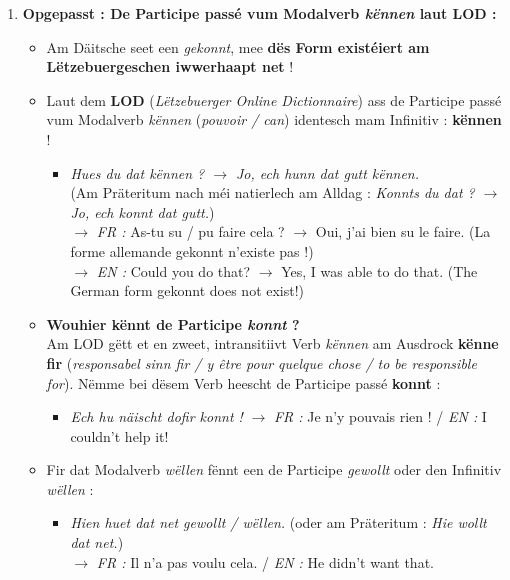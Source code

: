\begin{enumerate}
    \vspace{0.3em}

    \item \textbf{Opgepasst : De Participe passé vum Modalverb \textit{kënnen} laut LOD :}
    \begin{itemize}
        \item Am Däitsche seet een \textit{\flqq gekonnt\frqq}, mee \textbf{dës Form existéiert am Lëtzebuergeschen iwwerhaapt net} !
        \item Laut dem \textbf{LOD} (\textit{Lëtzebuerger Online Dictionnaire}) ass de Participe passé vum Modalverb \textit{kënnen} (\textit{pouvoir / can}) identesch mam Infinitiv : \textbf{kënnen} !
        \begin{itemize}
            \item \textit{Hues du dat kënnen ? $\rightarrow$ Jo, ech hunn dat gutt kënnen.} \\
            (Am Präteritum nach méi natierlech am Alldag : \textit{Konnts du dat ? $\rightarrow$ Jo, ech konnt dat gutt.}) \\
            $\rightarrow$ \textit{FR :} As-tu su / pu faire cela ? $\rightarrow$ Oui, j'ai bien su le faire. (La forme allemande \flqq gekonnt\frqq{} n'existe pas !) \\
            $\rightarrow$ \textit{EN :} Could you do that? $\rightarrow$ Yes, I was able to do that. (The German form \flqq gekonnt\frqq{} does not exist!)
        \end{itemize}
        \item \textbf{Wouhier kënnt de Participe \textit{\flqq konnt\frqq} ?} \\
        Am LOD gëtt et en zweet, intransitiivt Verb \textit{kënnen} am Ausdrock \textbf{kënne fir} (\textit{responsabel sinn fir / y être pour quelque chose / to be responsible for}). Nëmme bei dësem Verb heescht de Participe passé \textbf{konnt} :
        \begin{itemize}
            \item \textit{Ech hu näischt dofir konnt !} $\rightarrow$ \textit{FR :} Je n'y pouvais rien ! / \textit{EN :} I couldn't help it!
        \end{itemize}
        \item Fir dat Modalverb \textit{wëllen} fënnt een de Participe \textit{gewollt} oder den Infinitiv \textit{wëllen} :
        \begin{itemize}
            \item \textit{Hien huet dat net gewollt / wëllen.} (oder am Präteritum : \textit{Hie wollt dat net.}) \\
            $\rightarrow$ \textit{FR :} Il n'a pas voulu cela. / \textit{EN :} He didn't want that.
        \end{itemize}
    \end{itemize}
\end{enumerate}

